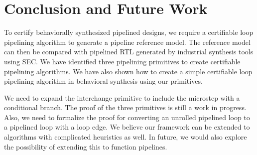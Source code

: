 \section{Conclusion and Future Work}
\label{sec:concl}

To certify behaviorally synthesized pipelined designs, we require a certifiable loop pipelining algorithm to generate a pipeline reference model. The reference model can then be compared with pipelined RTL generated by industrial synthesis tools using SEC. We have identified three pipelining primitives to create certifiable pipelining algorithms. We have also shown how to create a simple certifiable loop pipelining algorithm in behavioral synthesis using our primitives. 

We need to expand the interchange primitive to include the microstep with a conditional branch. The proof of the three primitives is still a work in progress. Also, we need to formalize the proof for converting an unrolled pipelined loop to a pipelined loop with a loop edge. We believe our framework can be extended to algorithms with complicated heuristics as well. In future, we would also explore the possibility of extending this to function pipelines.
